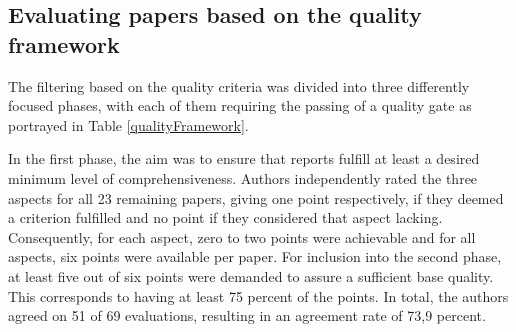 \documentclass[a4paper,11pt,article,oneside]{memoir}
\begin{document}


\subsection{Evaluating papers based on the quality framework}


The filtering based on the quality criteria was divided into three differently focused phases, with each of them requiring the passing of a quality gate as portrayed in Table \ref{qualityFramework}. 




In the first phase, the aim was to ensure that reports fulfill at least a desired minimum level of comprehensiveness. Authors independently rated the three aspects for all 23 remaining papers, giving one point respectively, if they deemed a criterion fulfilled and no point if they considered that aspect lacking. Consequently, for each aspect, zero to two points were achievable and for all aspects, six points were available per paper. For inclusion into the second phase, at least five out of six points were demanded to assure a sufficient base quality. This corresponds to having at least 75 percent of the points. In total, the authors agreed on 51 of 69 evaluations, resulting in an agreement rate of 73,9 percent.


\end{document}
